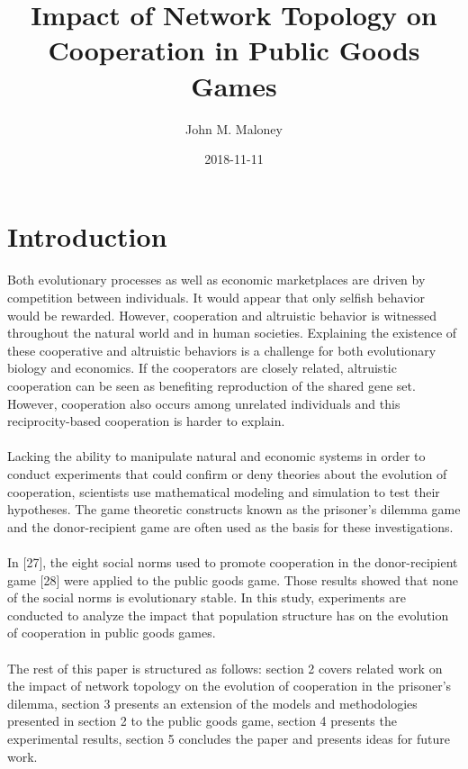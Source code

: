 \documentclass{article}
\title{Impact of Network Topology on Cooperation in Public Goods Games}
\date{2018-11-11}
\author{John M. Maloney}
\begin{document}
  \maketitle

  \section{Introduction}
  \paragraph{}Both evolutionary processes as well as economic marketplaces are driven by competition between individuals. It would appear that only selfish behavior would be rewarded.  However, cooperation and altruistic behavior is witnessed throughout the natural world and in human societies.  Explaining the existence of these cooperative and altruistic behaviors is a challenge for both evolutionary biology and economics.  If the cooperators are closely related, altruistic cooperation can be seen as benefiting reproduction of the shared gene set.  However, cooperation also occurs among unrelated individuals and this reciprocity-based cooperation is harder to explain.  
  \paragraph{}Lacking the ability to manipulate natural and economic systems in order to conduct experiments that could confirm or deny theories about the evolution of cooperation, scientists use mathematical modeling and simulation to test their hypotheses.  The game theoretic constructs known as the prisoner’s dilemma game and the donor-recipient game are often used as the basis for these investigations.
  \paragraph{}In [27], the eight social norms used to promote cooperation in the donor-recipient game [28] were applied to the public goods game.  Those results showed that none of the social norms is evolutionary stable.  In this study, experiments are conducted to analyze the impact that population structure has on the evolution of cooperation in public goods games.
  \paragraph{}The rest of this paper is structured as follows:  section 2 covers related work on the impact of network topology on the evolution of cooperation in the prisoner’s dilemma, section 3 presents an extension of the models and methodologies presented in section 2 to the public goods game, section 4 presents the experimental results, section 5 concludes the paper and presents ideas for future work.
  
\end{document}
